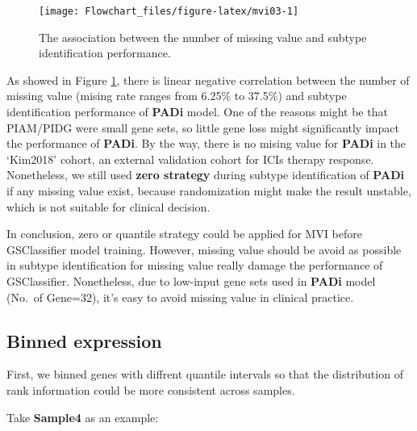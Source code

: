 \documentclass[
  12pt,
]{book}
\begin{document}
\begin{figure}

{\centering \texttt{[image: Flowchart\_files/figure-latex/mvi03-1]} 

}

\caption{The association between the number of missing value and subtype identification performance.}\label{fig:mvi03}
\end{figure}

As showed in Figure \ref{fig:mvi03}, there is linear negative correlation between the number of missing value (mising rate ranges from 6.25\% to 37.5\%) and subtype identification performance of \textbf{PADi} model. One of the reasons might be that PIAM/PIDG were small gene sets, so little gene loss might significantly impact the performance of \textbf{PADi}. By the way, there is no mising value for \textbf{PADi} in the `Kim2018' cohort, an external validation cohort for ICIs therapy response. Nonetheless, we still used \textbf{zero strategy} during subtype identification of \textbf{PADi} if any missing value exist, because randomization might make the result unstable, which is not suitable for clinical decision.

In conclusion, zero or quantile strategy could be applied for MVI before GSClassifier model training. However, missing value should be avoid as possible in subtype identification for missing value really damage the performance of GSClassifier. Nonetheless, due to low-input gene sets used in \textbf{PADi} model (No.~of Gene=32), it's easy to avoid missing value in clinical practice.

\hypertarget{binned-expression}{%
\subsection{Binned expression}\label{binned-expression}}

First, we binned genes with diffrent quantile intervals so that the distribution of rank information could be more consistent across samples.

Take \textbf{Sample4} as an example:
\end{document}
